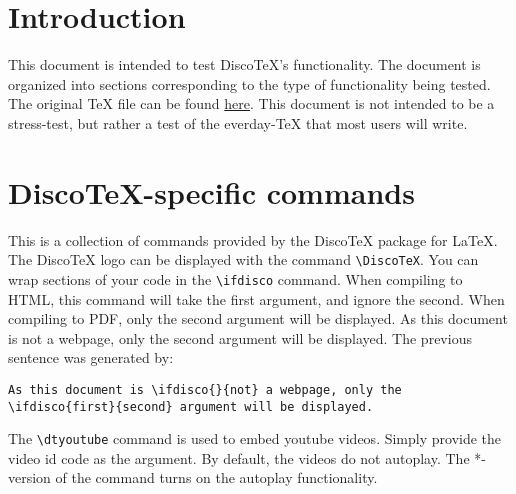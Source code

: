 \documentclass[11pt]{article}
\newcommand{\DiscoTeX}[0]{Disco\TeX}
\newcommand{\ifdisco}[2]{#2}
\begin{document}
\tableofcontents

\section{Introduction}

This document is intended to test \DiscoTeX's functionality.
The document is organized into sections corresponding to the type of functionality being tested.
The original \TeX{} file can be found \href{test.html}{here}.
This document is not intended to be a stress-test, but rather a test of the everday-\TeX{} that most users will write.

\section{\DiscoTeX-specific commands}
This is a collection of commands provided by the \DiscoTeX{} package for \LaTeX{}.
The \DiscoTeX{} logo can be displayed with the command \verb|\DiscoTeX|.
You can wrap sections of your code in the \verb|\ifdisco| command.
When compiling to HTML, this command will take the first argument, and ignore the second.
When compiling to PDF, only the second argument will be displayed.
As this document is \ifdisco{}{not} a webpage, only the \ifdisco{first}{second} argument will be displayed.
The previous sentence was generated by:
\begin{verbatim}
As this document is \ifdisco{}{not} a webpage, only the \ifdisco{first}{second} argument will be displayed.
\end{verbatim}

The \verb|\dtyoutube| command is used to embed youtube videos.
Simply provide the video id code as the argument.
By default, the videos do not autoplay.
The *-version of the command turns on the autoplay functionality.
\begin{center}
\end{center}

\end{document}
